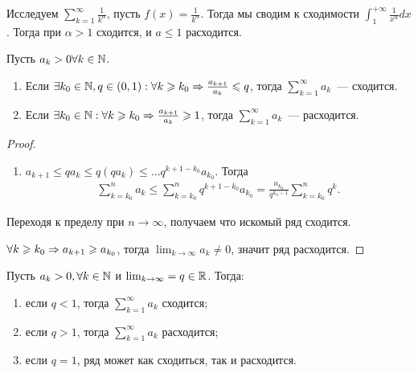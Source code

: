 \documentclass[../main.tex]{subfiles}
\begin{document}
\begin{example}
  Исследуем $ \sum_{k=1}^{\infty} \frac{1}{k^{\alpha}} $, пусть $f(x) = \frac{1}{k^{\alpha}}$. Тогда мы сводим к сходимости $\int_{1}^{+\infty} \frac{1}{x^{\alpha}} dx$. Тогда при $\alpha > 1$ сходится, и $a \leq 1$ расходится.  
\end{example}


\begin{proposition}
  Пусть $ a_k > 0 \forall k \in \mathbb{N}$.
  \begin{enumerate}
    \item Если $\exists k_0 \in \mathbb{N}, q \in (0, 1) : \forall k \geqslant k_0 \Rightarrow \frac{a_{k+1}}{a_k } \leqslant q$, тогда $ \sum_{k=1}^{\infty} a_k $~--- сходится. 
    \item Если $\exists k_0 \in \mathbb{N} : \forall k \geqslant k_0 \Rightarrow \frac{a_{k+1}}{a_k } \geqslant 1$, тогда $ \sum_{k=1}^{\infty} a_k $~--- расходится.
  \end{enumerate}
\end{proposition}


\begin{proof}
  \begin{enumerate}
    \item $a_{k+1} \leq qa_k \leq q (qa_k ) \leq ... q^{k+1-k_0}a_{k_0 }$. Тогда 
    \begin{gather} 
      \sum_{k=k_0 }^{n} a_k \leq \sum_{k=k_0 }^{n} q^{k+1-k_0 } a_{k_0 } = \frac{a_{k_0 }}{q^{k_0 -1}} \sum_{k=k_0 }^{n} q^{k}  .
    \end{gather} 
  \end{enumerate}
  Переходя к пределу при $n \to \infty$, получаем что искомый ряд сходится.
  \item $\forall k \geqslant k_0 \Rightarrow a_{k+1} \geqslant a_{k_0 }$, тогда $\lim_{k \to \infty} a_k \neq 0$, значит ряд расходится.  
\end{proof}


\begin{corollary}
  Пусть $a_k > 0, \forall k \in \mathbb{N}$ и $\lim_{k \to \infty} = q \in \mathbb{R}$. Тогда:
  \begin{enumerate}
    \item если $q < 1$, тогда $ \sum_{k=1}^{\infty} a_k$ сходится;
    \item если $q > 1$, тогда $ \sum_{k=1}^{\infty} a_k$ расходится;
    \item если $q = 1$, ряд может как сходиться, так и расходится. 
  \end{enumerate}  
\end{corollary}
\end{document}
